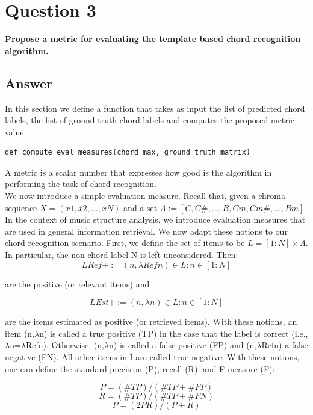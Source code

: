 \documentclass[
	12pt, %
]{fphw}
\begin{document}
\section*{\color{red}Question 3}

\begin{problem}
	\textbf{Propose a metric for evaluating the template based chord recognition algorithm.}
\end{problem}

\subsection*{\color{blue}Answer}

In this section we define a function that takes as input the list of predicted chord labels, the list of ground truth chord labels and computes the proposed metric value.
\begin{lstlisting}
def compute_eval_measures(chord_max, ground_truth_matrix)
\end{lstlisting}
A metric is a scalar number that expresses how good is the algorithm in performing the task of chord recognition.\\

We now introduce a simple evaluation measure. Recall that, given a chroma sequence \(X=(x1,x2,…,xN)\) and a set \( \Lambda :=[C,C\#,…,B,Cm,Cm\#,…,Bm] \)\\

In the context of music structure analysis, we introduce evaluation measures that are used in general information retrieval. We now adapt these notions to our chord recognition scenario. First, we define the set of items to be \(L=[1:N]×\Lambda\). In particular, the non-chord label N is left unconsidered. Then:
\[LRef+:={(n,\lambda Refn) \in L:n\in[1:N]}\]

are the positive (or relevant items) and

\[LEst+:={(n,\lambda n) \in L:n\in[1:N]}\]

are the items estimated as positive (or retrieved items). With these notions, an item (n,$\lambda$n) is called a true positive (TP) in the case that the label is correct (i.e., $\lambda$n=$\lambda$Refn). Otherwise, (n,$\lambda$n) is called a false positive (FP) and (n,$\lambda$Refn) a false negative (FN). All other items in I are called true negative. With these notions, one can define the standard precision (P), recall (R), and F-measure (F):

\[P=(\#TP)/(\#TP + \#FP)\]
\[R=(\#TP)/(\#TP + \#FN)\]
\[P=(2PR)/(P + R)\]
\end{document}

